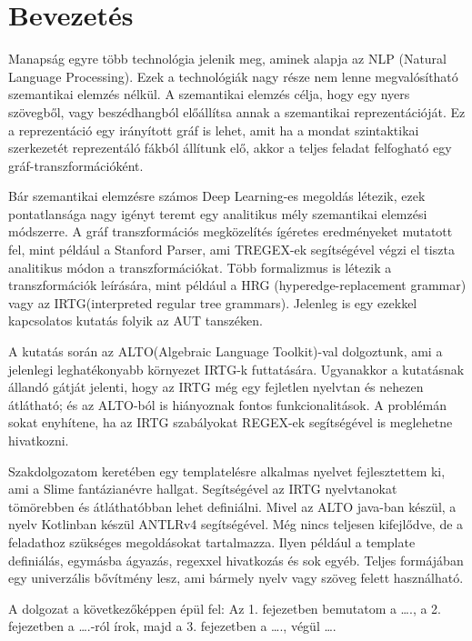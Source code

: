 \chapter{Bevezetés}

Manapság egyre több technológia jelenik meg, aminek alapja az NLP (Natural Language Processing). Ezek a technológiák nagy része nem lenne megvalósítható szemantikai elemzés nélkül. A szemantikai elemzés célja, hogy egy nyers szövegből, vagy beszédhangból előállítsa annak a szemantikai reprezentációját. Ez a reprezentáció egy irányított gráf is lehet, amit ha a mondat szintaktikai szerkezetét reprezentáló fákból állítunk elő, akkor a teljes feladat felfogható egy gráf-transzformációként. 

Bár szemantikai elemzésre számos Deep Learning-es megoldás létezik, ezek pontatlansága nagy igényt teremt egy analitikus mély szemantikai elemzési módszerre. A gráf transzformációs megközelítés ígéretes eredményeket mutatott fel, mint például a Stanford Parser, ami TREGEX-ek segítségével végzi el tiszta analitikus módon a transzformációkat.
Több formalizmus is létezik a transzformációk leírására, mint például a HRG (hyperedge-replacement grammar) vagy az IRTG(interpreted regular tree grammars). Jelenleg is egy ezekkel kapcsolatos kutatás folyik az AUT tanszéken.

A kutatás során az ALTO(Algebraic Language Toolkit)-val dolgoztunk, ami a jelenlegi leghatékonyabb környezet IRTG-k futtatására. Ugyanakkor a kutatásnak állandó gátját jelenti, hogy az IRTG még egy fejletlen nyelvtan és nehezen átlátható; és az ALTO-ból is hiányoznak fontos funkcionalitások. A problémán sokat enyhítene, ha az IRTG szabályokat REGEX-ek segítségével is meglehetne hivatkozni.

Szakdolgozatom keretében egy templatelésre alkalmas nyelvet fejlesztettem ki, ami a Slime fantázianévre hallgat. Segítségével az IRTG nyelvtanokat tömörebben és átláthatóbban lehet definiálni. Mivel az ALTO java-ban készül, a nyelv Kotlinban készül ANTLRv4 segítségével. Még nincs teljesen kifejlődve, de a feladathoz szükséges megoldásokat tartalmazza. Ilyen például a template definiálás, egymásba ágyazás, regexxel hivatkozás és sok egyéb. Teljes formájában egy univerzális bővítmény lesz, ami bármely nyelv vagy szöveg felett használható.
 	 	 	
A dolgozat a következőképpen épül fel: Az 1. fejezetben bemutatom a …., a 2. fejezetben a ….-ról írok, majd a 3. fejezetben a …., végül ….
